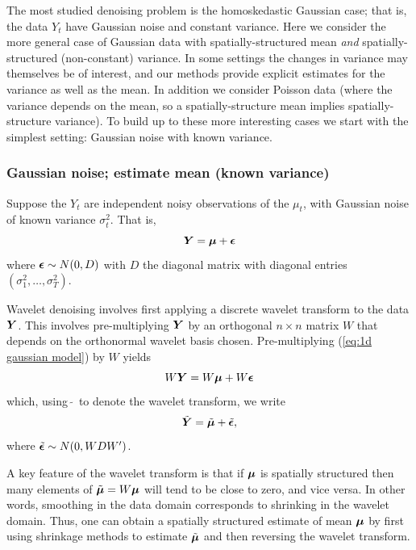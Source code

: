 \documentclass[12pt]{article}
\newcommand{\s}{\sigma}
\begin{document}
The most studied denoising problem is the homoskedastic Gaussian case; that is, 
the data $Y_t$ have Gaussian noise and constant variance.
Here we consider the more general case of Gaussian data with
spatially-structured mean {\it and} spatially-structured (non-constant) variance. 
In some settings the changes in variance may themselves be of interest, and our methods provide explicit estimates for the variance as well as the mean. In addition we consider Poisson data (where the variance depends on the mean, so 
a spatially-structure mean implies spatially-structure variance).
To build up to these more interesting cases we start with the simplest setting: 
Gaussian noise with known variance.

\subsubsection{Gaussian noise; estimate mean (known variance)}

Suppose the $Y_t$ are independent noisy observations of the $\mu_t$, with Gaussian noise of known variance $\s^2_t$. That is,
\begin{equation}\label{eq:1d gaussian model}
\bm{Y} =\bm{\mu}+\bm{\epsilon}
\end{equation}
where $\bm{\epsilon} \sim N(0,D)$ with $D$ the diagonal matrix with diagonal entries $(\s_1^2,\dots,\s_T^2)$.

Wavelet denoising involves first applying a discrete wavelet transform to the data $\bm{Y}$. This
involves pre-multiplying $\bm{Y}$ by an orthogonal $n\times n$ matrix $W$ that depends on the orthonormal wavelet basis chosen. Pre-multiplying (\ref{eq:1d gaussian model}) by $W$ yields
\begin{equation} 
W\bm{Y}=W\bm{\mu} + W\bm{\epsilon} 
\end{equation}
which, using $\,\tilde{}\,$ to denote the wavelet transform, we write
\begin{equation} \label{eq:wc}
\tilde{\bm{Y}}=\tilde{\bm{\mu}} + \tilde{\bm{\epsilon}},
\end{equation}
where $\tilde{\bm{\epsilon}} \sim N(0,W D W')$. 

A key feature of the wavelet transform is that if $\bm{\mu}$ is spatially structured 
then many elements of $\tilde{\bm{\mu}}=W\bm{\mu}$ will tend to be close to zero, and vice versa.
In other words, smoothing in the data domain corresponds to shrinking in the wavelet domain.
Thus, one can obtain a spatially structured estimate of
mean $\bm{\mu}$ by first using shrinkage methods to estimate $\tilde{\bm{\mu}}$ and then
reversing the wavelet transform. 
\end{document}
